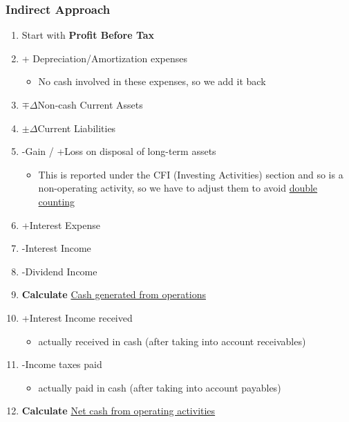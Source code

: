 \documentclass{article}
\begin{document}
\begin{multicols}{2}
\subsubsection{Indirect Approach}
\begin{enumerate}
	\item Start with \textbf{Profit Before Tax}
	\item + Depreciation/Amortization expenses
	\begin{itemize}
		\item No cash involved in these expenses, so we add it back
	\end{itemize}
    \item $\mp \Delta$Non-cash Current Assets
    \item $\pm \Delta$Current Liabilities
    \item -Gain / +Loss on disposal of long-term assets
    \begin{itemize}
    	\item This is reported under the CFI (Investing Activities) section and so is a non-operating activity, so we have to adjust them to avoid \underline{double counting}
    \end{itemize}
    \item +Interest Expense
	\item -Interest Income
	\item -Dividend Income
    \item \textbf{Calculate} \underline{Cash generated from operations}
    \item +Interest Income received
    \begin{itemize}
    	\item actually received in cash (after taking into account receivables)
    \end{itemize}
    \item -Income taxes paid
    \begin{itemize}
    	\item actually paid in cash (after taking into account payables)
    \end{itemize}
    \item \textbf{Calculate} \underline{Net cash from operating activities}
\end{enumerate}


\end{multicols}
\end{document}
